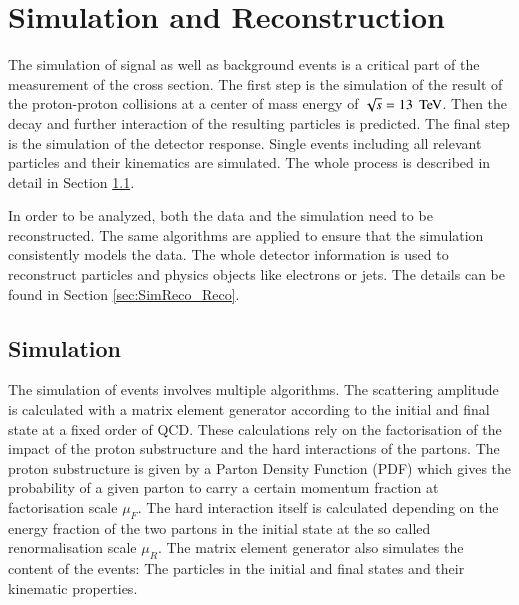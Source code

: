 
\chapter{Simulation and Reconstruction}

The simulation of signal as well as background events is a critical part of the measurement
of the \ttbar cross section. The first step is the simulation of the result of the proton-proton 
collisions at a center of mass energy of $\sqrt{s} = 13 \; \,\text{Te\hspace{-.08em}V}$. Then the decay and further interaction 
of the resulting particles is predicted. The final step is the simulation of the detector response.
Single events including all relevant particles and their kinematics are simulated.
The whole process is described in detail in Section \ref{sec:SimReco_Sim}.

In order to be analyzed, both the data and the simulation need to be reconstructed. The same algorithms are applied to ensure
that the simulation consistently models the data. 
The whole detector information is used to reconstruct particles and physics objects like electrons or jets.
The details can be found in Section \ref{sec:SimReco_Reco}. 


\section{Simulation}
\label{sec:SimReco_Sim}

The simulation of events involves multiple algorithms.
The scattering amplitude is calculated with a matrix element generator according to the initial and final state at a fixed order of QCD. These calculations rely on the factorisation of the impact of the proton substructure and the hard 
interactions of the partons. The proton substructure is given by a Parton Density Function (PDF) which gives the probability of a given parton to carry a certain momentum fraction 
at factorisation scale $\mu_F$. The hard interaction itself is calculated depending on the energy fraction of the two partons in the initial state at the so called renormalisation scale $\mu_R$.
The matrix element generator also simulates the content of the events: The particles in the initial and final states and their kinematic properties.







